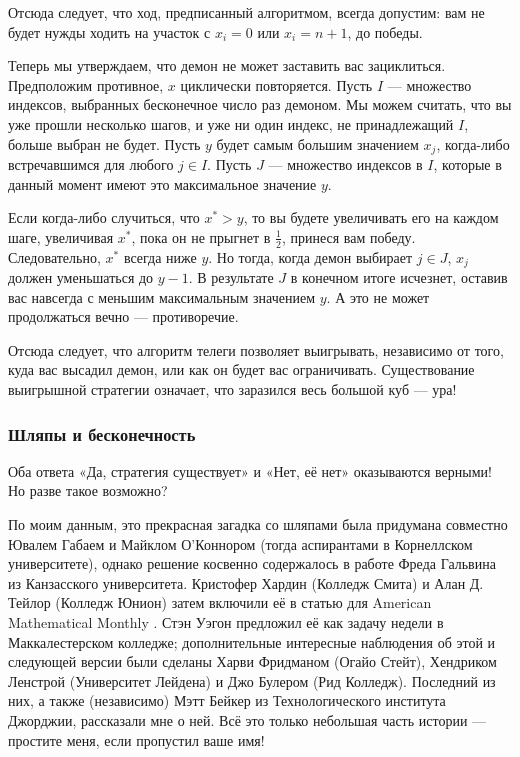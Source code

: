 Отсюда следует, что ход, предписанный алгоритмом, всегда допустим:
вам не будет нужды ходить на участок с $x_i = 0$ или $x_i = n + 1$, до победы.

Теперь мы утверждаем, что демон не может заставить вас зациклиться.
Предположим противное, $x$ циклически повторяется.
Пусть $I$ --- множество индексов, выбранных бесконечное число раз демоном.
Мы можем считать, что вы уже прошли несколько шагов, и уже ни один индекс, не принадлежащий $I$, больше выбран не будет.
Пусть $y$ будет самым большим значением $x_j$, когда-либо встречавшимся для любого $j \in I$.
Пусть $J$ --- множество индексов в $I$, которые в данный момент имеют это максимальное значение $y$.

Если когда-либо случиться, что $x^* > y$, то вы будете увеличивать его на каждом шаге, увеличивая $x^*$, пока он не прыгнет в $\tfrac12$, принеся вам победу.
Следовательно, $x^*$ всегда ниже $y$.
Но тогда, когда демон выбирает $j \in J$, $x_j$ должен уменьшаться до $y - 1$.
В результате $J$ в конечном итоге исчезнет, оставив вас навсегда с меньшим максимальным значением $y$.
А это не может продолжаться вечно --- противоречие.

Отсюда следует, что алгоритм телеги позволяет выигрывать, независимо от того, куда вас высадил демон, или как он будет вас ограничивать.
Существование выигрышной стратегии означает, что заразился весь большой куб --- ура!

\subsubsection*{Шляпы и бесконечность}

Оба ответа «Да, стратегия существует» и «Нет, её нет» оказываются верными!
Но разве такое возможно?

По моим данным, это прекрасная загадка со шляпами была придумана совместно Ювалем Габаем и Майклом О'Коннором (тогда аспирантами в Корнеллском университете), однако решение косвенно содержалось в работе Фреда Гальвина из Канзасского университета.
Кристофер Хардин (Колледж Смита) и Алан Д. Тейлор (Колледж Юнион) затем включили её в статью для American Mathematical Monthly \cite{36}.
Стэн Уэгон предложил её как задачу недели в Маккалестерском колледже; дополнительные интересные наблюдения об этой и следующей версии были сделаны Харви Фридманом (Огайо Стейт), Хендриком Ленстрой (Университет Лейдена) и Джо Булером (Рид Колледж).
Последний из них, а также (независимо) Мэтт Бейкер из Технологического института Джорджии, рассказали мне о ней.
Всё это только небольшая часть истории --- простите меня, если пропустил ваше имя!

